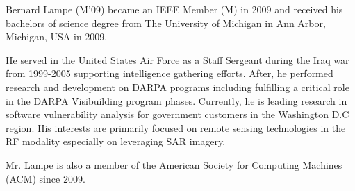 \documentclass[journal]{IEEEtran}
\begin{document}
\nocite{*}



\begin{IEEEbiographynophoto}{Bernard Lampe}
(M'09) became an IEEE Member (M) in 2009 and received his bachelors of science degree from The University of Michigan in Ann Arbor, Michigan, USA in 2009.
\par He served in the United States Air Force as a Staff Sergeant during the Iraq war from 1999-2005 supporting intelligence gathering efforts. After, he performed research and development on DARPA programs including fulfilling a critical role in the DARPA Visibuilding program phases. Currently, he is leading research in software vulnerability analysis for government customers in the Washington D.C region. His interests are primarily focused on remote sensing technologies in the RF modality especially on leveraging SAR imagery.
\par Mr. Lampe is also a member of the American Society for Computing Machines (ACM) since 2009.
\end{IEEEbiographynophoto}

\end{document}
